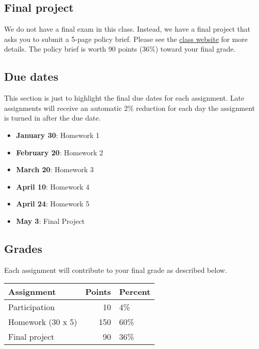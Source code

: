 \documentclass[11pt,]{article}
\providecommand{\tightlist}{%
  \setlength{\itemsep}{0pt}\setlength{\parskip}{0pt}}
\begin{document}
\hypertarget{final-project}{%
\subsection{Final project}\label{final-project}}

We do not have a final exam in this class. Instead, we have a final
project that asks you to submit a 5-page policy brief. Please see the
\href{https://econ470s23.classes.ianmccarthyecon.com/}{class website}
for more details. The policy brief is worth 90 points (36\%) toward your
final grade.

\hypertarget{due-dates}{%
\subsection{Due dates}\label{due-dates}}

This section is just to highlight the final due dates for each
assignment. Late assignments will receive an automatic 2\% reduction for
each day the assignment is turned in after the due date.

\begin{itemize}
\tightlist
\item
  \textbf{January 30}: Homework 1
\item
  \textbf{February 20}: Homework 2
\item
  \textbf{March 20}: Homework 3
\item
  \textbf{April 10}: Homework 4
\item
  \textbf{April 24}: Homework 5
\item
  \textbf{May 3}: Final Project
\end{itemize}

\hypertarget{grades}{%
\subsection{Grades}\label{grades}}

Each assignment will contribute to your final grade as described below.

\begin{longtable}[]{@{}lrl@{}}
\toprule()
Assignment & Points & Percent \\
\midrule()
\endhead
Participation & 10 & 4\% \\
Homework (30 x 5) & 150 & 60\% \\
Final project & 90 & 36\% \\
\bottomrule()
\end{longtable}
\end{document}

